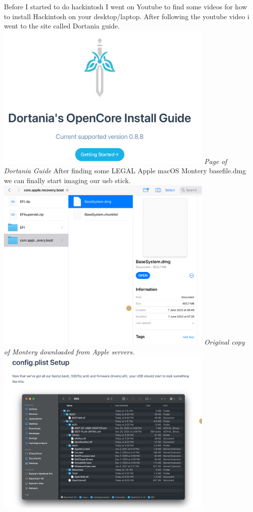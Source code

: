 \documentclass[12pt, letterpaper]{article}
\begin{document}
Before I started to do hackintosh I went on Youtube to find some videos for how to install Hackintosh on your desktop/laptop.
\hfill\break
\hfill\break
After following the youtube video i went to the site called Dortania guide.
\hfill\break
\includegraphics[width=0.8\textwidth]{fotos/PSP/Research header/Dortania opencore.jpeg}
\break
\emph{Page of Dortania Guide}
\hfill\break
\hfill\break
After finding some LEGAL Apple macOS Montery basefile.dmg we can finally start imaging our usb stick.
\hfill\break
\includegraphics[width=0.8\textwidth]{fotos/PSP/Research header/Montereydmg.jpeg}
\break
\emph{Original copy of Montery downloaded from Apple servers.}
\hfill\break
\hfill\break
\includegraphics[width=0.8\textwidth]{fotos/PSP/Research header/Sampleconfigplist.jpeg}
\end{document}
